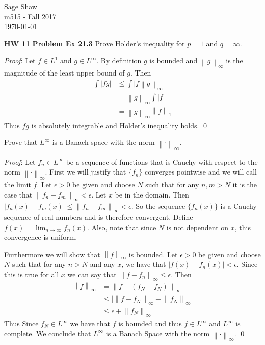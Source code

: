 \documentclass[12pt]{article}
\newcommand{\problem}[1]{\hspace{-4 ex} \large \textbf{Problem #1} }
\newcommand{\norm}[1]{\left\lVert#1\right\rVert}
\renewenvironment{proof}{\hspace{-4 ex} \emph{Proof}:}{\qed}
\begin{document}
	\thispagestyle{empty}
	
	\begin{flushright}
		Sage Shaw \\
		m515 - Fall 2017 \\
		\today
	\end{flushright}
	
{\large \textbf{HW 11}}\bigbreak
\problem{Ex 21.3} Prove Holder's inequality for $p=1$ and $q=\infty$.

	\begin{proof}
		Let $f \in L^1$ and $g \in L^\infty$. By definition $g$ is bounded and $\norm{g}_\infty$ is the magnitude of the least upper bound of $g$. Then
		\begin{align*}
			\int \vert fg \vert & \leq \int \vert f \norm{g}_\infty \vert \\
			& = \norm{g}_\infty \int \vert f \vert \\
			& = \norm{g}_\infty \norm{f}_1
		\end{align*}
		Thus $fg$ is absolutely integrable and Holder's inequality holds.
	\end{proof}

	\bigbreak
Prove that $L^\infty$ is a Banach space with the norm $\norm{\cdot}_\infty$. \bigbreak

	\begin{proof}
		Let $f_n \in L^\infty$ be a sequence of functions that is Cauchy with respect to the norm $\norm{\cdot}_\infty$. First we will justify that $\{f_n\}$ converges pointwise and we will call the limit $f$. Let $\epsilon > 0$ be given and choose $N$ such that for any $n,m > N$ it is the case that $\norm{f_n - f_m}_\infty < \epsilon$. Let $x$ be in the domain. Then $\vert f_n(x) - f_m(x) \vert \leq \norm{f_n - f_m}_\infty < \epsilon$. So the sequence $\{f_n(x)\}$ is a Cauchy sequence of real numbers and is therefore convergent. Define $f(x) = \lim_{n \to \infty} f_n(x)$. Also, note that since $N$ is not dependent on $x$, this convergence is uniform.  \bigbreak
		
		Furthermore we will show that $\norm{f}_\infty$ is bounded. Let $\epsilon > 0$ be given and choose $N$ such that for any $n> N$ and any $x$, we have that $\vert f(x) - f_n(x)\vert < \epsilon$. Since this is true for all $x$ we can say that $\norm{f- f_n}_\infty \leq \epsilon$. Then
		\begin{align*}
			\norm{f}_\infty & = \norm{f - (f_N - f_N)}_\infty  \\
			& \leq \vert \norm{f - f_N}_\infty - \norm{f_N}_\infty \vert \\
			& \leq \epsilon + \norm{f_N}_\infty
		\end{align*}
		Thus Since $f_N \in L^\infty$ we have that $f$ is bounded and thus $f \in L^\infty$ and $L^\infty$ is complete. We conclude that $L^\infty$ is a Banach Space with the norm $\norm{\cdot}_\infty$. 
	\end{proof}
\end{document}
